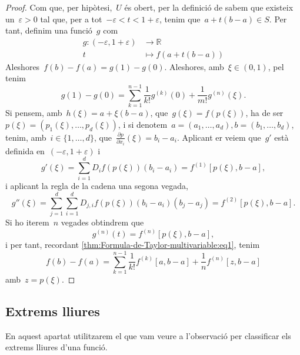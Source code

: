 \documentclass[../calcul-en-diverses-variables.tex]{subfiles}
\begin{document}
    \begin{proof}
        Com que, per hipòtesi,~\(U\) és obert, per la definició de  sabem que existeix un~\(\varepsilon>0\) tal que, per a tot~\(-\varepsilon<t<1+\varepsilon\), tenim que~\(a+t(b-a)\in S\).
        Per tant, definim una funció~\(g\) com
        \begin{align*}
        g\colon(-\varepsilon,1+\varepsilon)&\to\mathbb{R}\\
        t&\mapsto f(a+t(b-a))
        \end{align*}
        Aleshores~\(f(b)-f(a)=g(1)-g(0)\).
        Aleshores, amb~\(\xi\in(0,1)\), pel  tenim
        \begin{equation}\label{thm:Formula-de-Taylor-multivariable:eq1}
        g(1)-g(0)=\sum_{k=1}^{n-1}\frac{1}{k!}g^{(k)}(0)+\frac{1}{m!}g^{(n)}(\xi).
        \end{equation}
        Si pensem, amb~\(h(\xi)=a+\xi(b-a)\), que~\(g(\xi)=f(p(\xi))\), ha de ser~\(p(\xi)=(p_{1}(\xi),\dots,p_{d}(\xi))\), i si denotem~\(a=(a_{1},\dots,a_{d}),b=(b_{1},\dots,b_{d})\), tenim, amb~\(i\in\{1,\dots,d\}\), que~\(\frac{\partial p}{\partial x_{i}}(\xi)=b_{i}-a_{i}\).
        Aplicant er  veiem que~\(g'\) està definida en~\((-\varepsilon,1+\varepsilon)\) i
        \[
            g'(\xi)=\sum_{i=1}^{d}D_{i}f(p(\xi))(b_{i}-a_{i})=f^{(1)}[p(\xi),b-a],
        \]
        i aplicant la regla de la cadena una segona vegada,
        \[
            g''(\xi)=\sum_{j=1}^{d}\sum_{i=1}^{d}D_{j,i}f(p(\xi))(b_{i}-a_{i})(b_{j}-a_{j})=f^{(2)}[p(\xi),b-a].
        \]
        Si ho iterem~\(n\) vegades obtindrem que
        \[
            g^{(n)}(t)=f^{(n)}[p(\xi),b-a],
        \]
        i per tant, recordant \eqref{thm:Formula-de-Taylor-multivariable:eq1}, tenim
        \[
            f(b)-f(a)=\sum_{k=1}^{n-1}\frac{1}{k!}f^{(k)}[a,b-a]+\frac{1}{n}f^{(n)}[z,b-a]
        \]
        amb~\(z=p(\xi)\).
    \end{proof}
    \subsection{Extrems lliures}\label{sec:Classificar-extrems-lliures}
    En aquest apartat utilitzarem el que vam veure a l'observació  per classificar els extrems lliures d'una funció.
\end{document}
